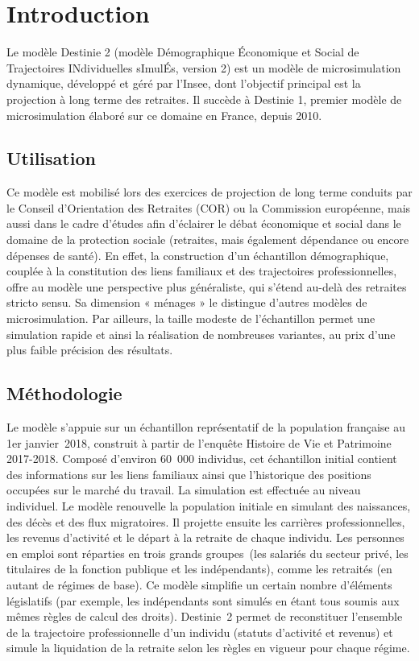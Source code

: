 \section{Introduction}
Le modèle Destinie 2 (modèle Démographique Économique et Social de Trajectoires INdividuelles sImulÉs, version 2) est un modèle de microsimulation dynamique, développé et géré par l’Insee, dont l’objectif principal est la projection à long terme des retraites. Il succède à Destinie 1, premier modèle de microsimulation élaboré sur ce domaine en France, depuis 2010.

\subsection*{Utilisation}
Ce modèle est mobilisé lors des exercices de projection de long terme conduits par le Conseil d’Orientation des Retraites (COR) ou la Commission européenne, mais aussi dans le cadre d'études afin d'éclairer le débat économique et social dans le domaine de la protection sociale (retraites, mais également dépendance ou encore dépenses de santé). En effet, la construction d’un échantillon démographique, couplée à la constitution des liens familiaux et des trajectoires professionnelles, offre au modèle une perspective plus généraliste, qui s’étend au-delà des retraites stricto sensu. Sa dimension « ménages » le distingue d’autres modèles de microsimulation. Par ailleurs, la taille modeste de l'échantillon permet une simulation rapide et ainsi la réalisation de nombreuses variantes, au prix d’une plus faible précision des résultats.


\subsection*{Méthodologie}
Le modèle s’appuie sur un échantillon représentatif de la population française au 1er janvier 2018, construit à partir de l’enquête Histoire de Vie et Patrimoine 2017-2018. Composé d’environ 60 000 individus, cet échantillon initial contient des informations sur les liens familiaux ainsi que l'historique des positions occupées sur le marché du travail.
La simulation est effectuée au niveau individuel. Le modèle renouvelle la population initiale en simulant des naissances, des décès et des flux migratoires. Il projette ensuite les carrières professionnelles, les revenus d’activité et le départ à la retraite de chaque individu.
Les personnes en emploi sont réparties en trois grands groupes (les salariés du secteur privé, les titulaires de la fonction publique et les indépendants), comme les retraités (en autant de régimes de base). Ce modèle simplifie un certain nombre d’éléments législatifs (par exemple, les indépendants sont simulés en étant tous soumis aux mêmes règles de calcul des droits). Destinie 2 permet de reconstituer l’ensemble de la trajectoire professionnelle d’un individu (statuts d’activité et revenus) et simule la liquidation de la retraite selon les règles en vigueur pour chaque régime.

